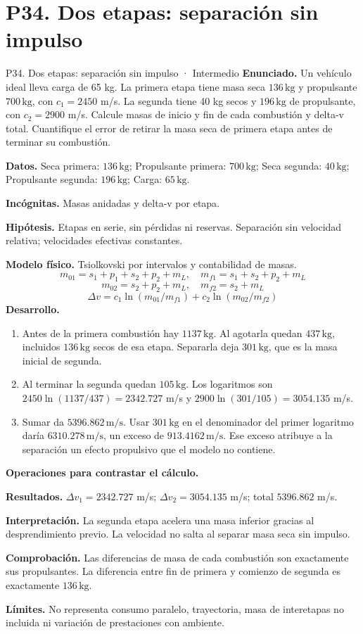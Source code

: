 \section{P34. Dos etapas: separación sin impulso}
\begin{studiumworked}{P34. Dos etapas: separación sin impulso · Intermedio}
\textbf{Enunciado.} Un vehículo ideal lleva carga de 65 kg. La primera etapa tiene masa seca $136\,\mathrm{kg}$ y propulsante $700\,\mathrm{kg}$, con $c_1=2450$ m/s. La segunda tiene 40 kg secos y $196\,\mathrm{kg}$ de propulsante, con $c_2=2900$ m/s. Calcule masas de inicio y fin de cada combustión y delta-v total. Cuantifique el error de retirar la masa seca de primera etapa antes de terminar su combustión.

\textbf{Datos.} Seca primera: $136\,\mathrm{kg}$; Propulsante primera: $700\,\mathrm{kg}$; Seca segunda: $40\,\mathrm{kg}$; Propulsante segunda: $196\,\mathrm{kg}$; Carga: $65\,\mathrm{kg}$.

\textbf{Incógnitas.} Masas anidadas y delta-v por etapa.

\textbf{Hipótesis.} Etapas en serie, sin pérdidas ni reservas. Separación sin velocidad relativa; velocidades efectivas constantes.

\textbf{Modelo físico.} Tsiolkovski por intervalos y contabilidad de masas.
\[m_{01}=s_1+p_1+s_2+p_2+m_L,\quad m_{f1}=s_1+s_2+p_2+m_L\]
\[m_{02}=s_2+p_2+m_L,\quad m_{f2}=s_2+m_L\]
\[\Delta v=c_1\ln(m_{01}/m_{f1})+c_2\ln(m_{02}/m_{f2})\]
\textbf{Desarrollo.}
\begin{enumerate}
\item Antes de la primera combustión hay $1137\,\mathrm{kg}$. Al agotarla quedan $437\,\mathrm{kg}$, incluidos $136\,\mathrm{kg}$ secos de esa etapa. Separarla deja $301\,\mathrm{kg}$, que es la masa inicial de segunda.
\item Al terminar la segunda quedan $105\,\mathrm{kg}$. Los logaritmos son $2450\ln(1137/437)=2342.727$ m/s y $2900\ln(301/105)=3054.135$ m/s.
\item Sumar da $5396.862\,\mathrm{m/s}$. Usar $301\,\mathrm{kg}$ en el denominador del primer logaritmo daría $6310.278\,\mathrm{m/s}$, un exceso de $913.4162\,\mathrm{m/s}$. Ese exceso atribuye a la separación un efecto propulsivo que el modelo no contiene.
\end{enumerate}
\textbf{Operaciones para contrastar el cálculo.}

\textbf{Resultados.} $\Delta v_1=2342.727$ m/s; $\Delta v_2=3054.135$ m/s; total $5396.862$ m/s.

\textbf{Interpretación.} La segunda etapa acelera una masa inferior gracias al desprendimiento previo. La velocidad no salta al separar masa seca sin impulso.

\textbf{Comprobación.} Las diferencias de masa de cada combustión son exactamente sus propulsantes. La diferencia entre fin de primera y comienzo de segunda es exactamente $136\,\mathrm{kg}$.

\textbf{Límites.} No representa consumo paralelo, trayectoria, masa de interetapas no incluida ni variación de prestaciones con ambiente.
\end{studiumworked}
